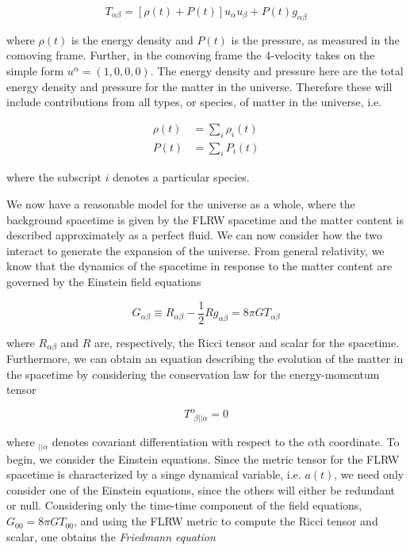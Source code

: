 \documentclass[10pt,letterpaper,final]{iopart}
\numberwithin{equation}{subsection}
\def\ni{\noindent}
\begin{document}
\begin{equation}\label{eq:Tperffluid}
T_{\alpha\beta} = \left[\rho(t) + P(t)\right]u_\alpha u_\beta + P(t) g_{\alpha \beta}
\end{equation}

\ni where $\rho(t)$ is the energy density and $P(t)$ is the pressure, as measured in the comoving frame. Further, in the comoving frame the 4-velocity takes on the simple form $u^\alpha = (1,0,0,0)$. The energy density and pressure here are the total energy density and pressure for the matter in the universe. Therefore these will include contributions from all types, or species, of matter in the universe, i.e.

\begin{align}
\label{eq:rho} \rho(t) &= \sum_i \rho_i(t) \\
\label{eq:P} P(t) &= \sum_i P_i(t)
\end{align}

\ni where the subscript $i$ denotes a particular species. 

We now have a reasonable model for the universe as a whole, where the background spacetime is given by the FLRW spacetime and the matter content is described approximately as a perfect fluid. We can now consider how the two interact to generate the expansion of the universe. From general relativity, we know that the dynamics of the spacetime in response to the matter content are governed by the Einstein field equations

\begin{equation}\label{eq:Einstein}
G_{\alpha\beta} \equiv R_{\alpha\beta} - \frac{1}{2}R g_{\alpha\beta} = 8\pi G T_{\alpha\beta}
\end{equation}

\ni where $R_{\alpha\beta}$ and $R$ are, respectively, the Ricci tensor and scalar for the spacetime. Furthermore, we can obtain an equation describing the evolution of the matter in the spacetime by considering the conservation law for the energy-momentum tensor

\begin{equation}\label{eq:conservation}
T^{\alpha}_{\ \ \beta || \alpha} = 0
\end{equation}

\ni where $_{|| \alpha}$ denotes covariant differentiation with respect to the $\alpha$th coordinate.
To begin, we consider the Einstein equations. Since the metric tensor for the FLRW spacetime is characterized by a singe dynamical variable, i.e. $a(t)$, we need only consider one of the Einstein equations, since the others will either be redundant or null. Considering only the time-time component of the field equations, $G_{00} = 8\pi GT_{00}$, and using the FLRW metric to compute the Ricci tensor and scalar, one obtains the \emph{Friedmann equation}
\end{document}

